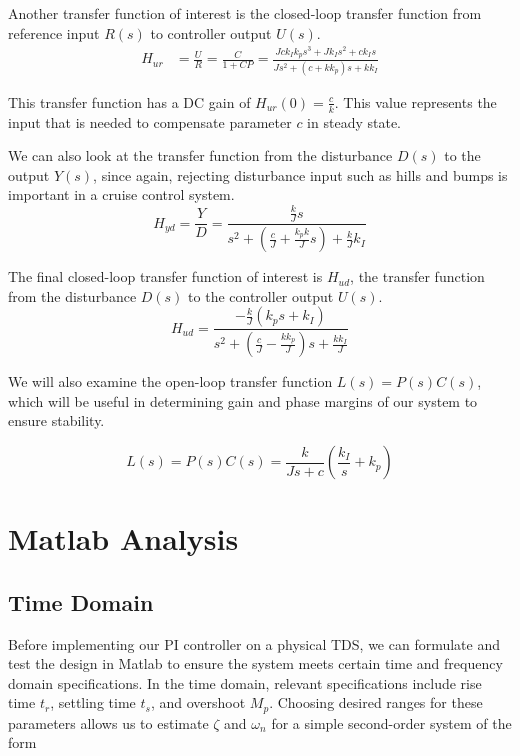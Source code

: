 \documentclass[11pt,titlepage]{article}
\begin{document}
	Another transfer function of interest is the closed-loop transfer function from reference input $R(s)$ to controller output $U(s)$.
	\begin{align}
		H_{ur}&=\frac{U}{R}=\frac{C}{1+CP}=\frac{Jck_Ik_ps^3+Jk_Is^2+ck_Is}{Js^2+(c+kk_p)s+kk_I}
	\end{align}
	
	This transfer function has a DC gain of  $H_{ur}(0)=\frac{c}{k}$. This value represents the input that is needed to compensate parameter $c$ in steady state. 
		
	We can also look at the transfer function from the disturbance $D(s)$ to the output $Y(s)$, since again, rejecting disturbance input such as hills and bumps is important in a cruise control system.
	\begin{equation}
		H_{yd}=\frac{Y}{D}=\frac{\frac{k}{J}s}{s^2+(\frac{c}{J}+\frac{k_pk}{J}s)+\frac{k}{J}k_I}
	\end{equation}
	
	The final closed-loop transfer function of interest is $H_{ud}$, the transfer function from the disturbance $D(s)$ to the controller output $U(s)$. 
	\begin{equation}
		H_{ud}=\frac{-\frac{k}{J}(k_ps+k_I)}{s^2+(\frac{c}{J}-\frac{kk_p}{J})s+\frac{kk_I}{J}}
	\end{equation}	
		
	We will also examine the open-loop transfer function $L(s)=P(s)C(s)$, which will be useful in determining gain and phase margins of our system to ensure stability.
	
	\begin{equation}
		L(s)=P(s)C(s)=	\frac{k}{Js+c}(\frac{k_I}{s}+k_p)
		\end{equation}

\section{Matlab Analysis}
    \subsection{Time Domain}
	    Before implementing our PI controller on a physical TDS, we can formulate and test the design in Matlab to ensure the system meets certain time and frequency domain specifications. In the time domain, relevant specifications include rise time $t_r$, settling time $t_s$, and overshoot $M_p$. Choosing desired ranges for these parameters allows us to estimate $\zeta$ and $\omega_{n}$ for a simple second-order system of the form
	    
\end{document}
